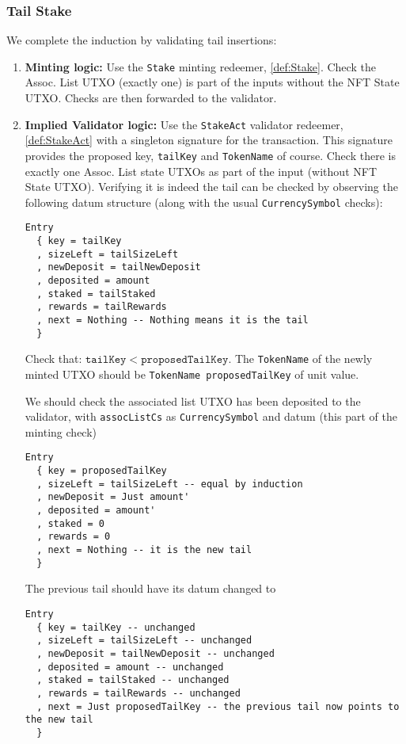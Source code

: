 \documentclass[10pt, a4paper]{article}
\theoremstyle{definition}
\begin{document}
\subsubsection{Tail Stake}\label{subsubsection:TailStake}
We complete the induction by validating tail insertions:
\begin{enumerate}
\item{\textbf{Minting logic:} Use the \texttt{Stake} minting redeemer, \ref{def:Stake}. Check the Assoc. List UTXO (exactly one) is part of the inputs without the NFT State UTXO. Checks are then forwarded to the validator.
}

\item{\textbf{Implied Validator logic:} Use the \texttt{StakeAct} validator redeemer, \ref{def:StakeAct} with a singleton signature for the transaction. This signature provides the proposed key, \texttt{tailKey} and \texttt{TokenName} of course. Check there is exactly one Assoc. List state UTXOs as part of the input (without NFT State UTXO). Verifying it is indeed the tail can be checked by observing the following datum structure (along with the usual \texttt{CurrencySymbol} checks):
\begin{verbatim}
Entry
  { key = tailKey
  , sizeLeft = tailSizeLeft
  , newDeposit = tailNewDeposit
  , deposited = amount
  , staked = tailStaked 
  , rewards = tailRewards 
  , next = Nothing -- Nothing means it is the tail
  }
\end{verbatim}

Check that: $\texttt{tailKey} < \texttt{proposedTailKey}.$ The \texttt{TokenName} of the newly minted UTXO should be \texttt{TokenName proposedTailKey} of unit value.

 We should check the associated list UTXO has been deposited to the validator, with \texttt{assocListCs} as \texttt{CurrencySymbol} and datum (this part of the minting check)
\begin{verbatim}
Entry
  { key = proposedTailKey
  , sizeLeft = tailSizeLeft -- equal by induction
  , newDeposit = Just amount'
  , deposited = amount'
  , staked = 0 
  , rewards = 0
  , next = Nothing -- it is the new tail
  }
\end{verbatim}

The previous tail should have its datum changed to \begin{verbatim}
Entry
  { key = tailKey -- unchanged
  , sizeLeft = tailSizeLeft -- unchanged
  , newDeposit = tailNewDeposit -- unchanged
  , deposited = amount -- unchanged
  , staked = tailStaked -- unchanged
  , rewards = tailRewards -- unchanged
  , next = Just proposedTailKey -- the previous tail now points to the new tail
  }
\end{verbatim}

}
\end{enumerate}
\end{document}
